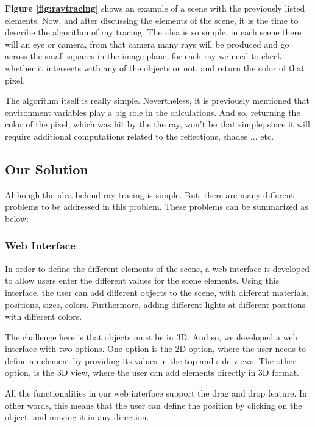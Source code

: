 \documentclass{article}
\begin{document}
	\par \textbf{Figure \ref{fig:raytracing}} shows an example of a scene with the previously listed elements. Now, and after discussing the elements of the scene, it is the time to describe the algorithm of ray tracing. The idea is so simple, in each scene there will an eye or camera, from that camera many rays will be produced and go across the small squares in the image plane, for each ray we need to check whether it intersects with any of the objects or not, and return the color of that pixel.\\
	\par The algorithm itself is really simple. Nevertheless, it is previously mentioned that environment variables play a big role in the calculations. And so, returning the color of the pixel, which was hit by the the ray, won't be that simple; since it will require additional computations related to the reflections, shades ... etc. 
	\subsection{Our Solution}
	Although the idea behind ray tracing is simple. But, there are many different problems to be addressed in this problem. These problems can be summarized as below:
	\subsubsection{Web Interface}
	In order to define the different elements of the scene, a web interface is developed to allow users enter the different values for the scene elements. Using this interface, the user can add different objects to the scene, with different materials, positions, sizes, colors. Furthermore, adding different lights at different positions with different colors. \\
	\par The challenge here is that objects must be in 3D. And so, we developed a web interface with two options. One option is the 2D option, where the user needs to define an element by providing its values in the top and side views. The other option, is the 3D view, where the user can add elements directly in 3D format.\\
	\par All the functionalities in our web interface support the drag and drop feature. In other words, this means that the user can define the position by clicking on the object, and moving it in any direction.
\end{document}
